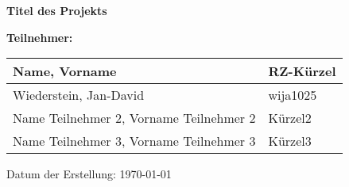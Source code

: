 \documentclass[a4paper, 12pt]{article}
\begin{document}
\begin{titlepage}
    \centering
    
    \vspace*{4cm} 
    
    {\fontsize{24pt}{30pt}\selectfont \textbf{Titel des Projekts}}\par\vspace{1cm}
    
    \hrulefill\par\vspace{0.5cm}
    
    {\Large \textbf{Teilnehmer:}}\par\vspace{0.5cm}
    
    \begin{tabular}{ll}
        Name, Vorname & RZ-Kürzel \\
        \hline
        Wiederstein, Jan-David & wija1025 \\
        Name Teilnehmer 2, Vorname Teilnehmer 2 & Kürzel2 \\
        Name Teilnehmer 3, Vorname Teilnehmer 3 & Kürzel3 \\
    \end{tabular}\par\vspace{1cm}
    
    \hrulefill\par\vspace{1cm}
    
    {\large Datum der Erstellung: \today}\par
    
    
\end{titlepage}
\end{document}
